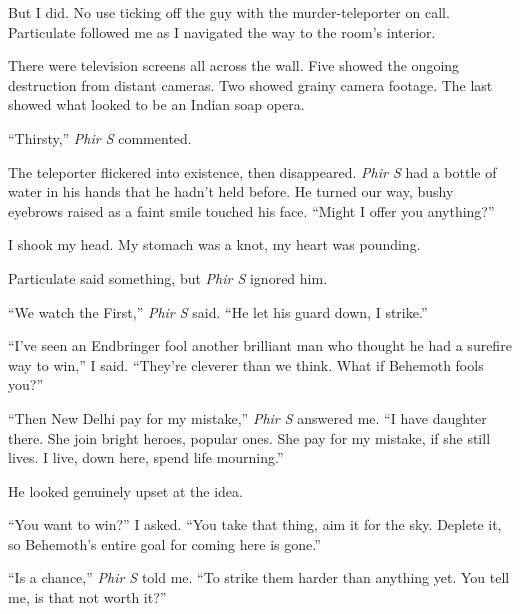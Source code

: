 But I did.  No use ticking off the guy with the murder-teleporter on call.  Particulate followed me as I navigated the way to the room's interior.



There were television screens all across the wall.  Five showed the ongoing destruction from distant cameras.  Two showed grainy camera footage.  The last showed what looked to be an Indian soap opera.



``Thirsty,'' \emph{Phir S }commented.



The teleporter flickered into existence, then disappeared.  \emph{Phir S }had a bottle of water in his hands that he hadn't held before.  He turned our way, bushy eyebrows raised as a faint smile touched his face.  ``Might I offer you anything?''



I shook my head.  My stomach was a knot, my heart was pounding.



Particulate said something, but \emph{Phir S }ignored him.



``We watch the First,'' \emph{Phir S }said.  ``He let his guard down, I strike.''



``I've seen an Endbringer fool another brilliant man who thought he had a surefire way to win,'' I said.  ``They're cleverer than we think.  What if Behemoth fools you?''



``Then New Delhi pay for my mistake,'' \emph{Phir S }answered me.  ``I have daughter there.  She join bright heroes, popular ones.  She pay for my mistake, if she still lives.  I live, down here, spend life mourning.''



He looked genuinely upset at the idea.



``You want to win?'' I asked.  ``You take that thing, aim it for the sky.  Deplete it, so Behemoth's entire goal for coming here is gone.''



``Is a chance,'' \emph{Phir S }told me.  ``To strike them harder than anything yet.  You tell me, is that not worth it?''



